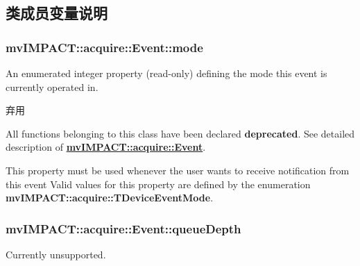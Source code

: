 \subsection{类成员变量说明}
\hypertarget{classmv_i_m_p_a_c_t_1_1acquire_1_1_event_af129965537dfc66b9661538619872fd0}{
\subsubsection[{mode}]{ mv\+I\+M\+P\+A\+C\+T\+::acquire\+::\+Event\+::mode}}\label{classmv_i_m_p_a_c_t_1_1acquire_1_1_event_af129965537dfc66b9661538619872fd0}


An enumerated integer property {\bfseries }(read-\/only) defining the mode this event is currently operated in. 

\begin{DoxyRefDesc}{弃用}
\item[\hyperlink{deprecated__deprecated000021}{弃用}]All functions belonging to this class have been declared {\bfseries deprecated}. See detailed description of {\bfseries \hyperlink{classmv_i_m_p_a_c_t_1_1acquire_1_1_event}{mv\+I\+M\+P\+A\+C\+T\+::acquire\+::\+Event}}.\end{DoxyRefDesc}


This property must be used whenever the user wants to receive notification from this event Valid values for this property are defined by the enumeration {\bfseries mv\+I\+M\+P\+A\+C\+T\+::acquire\+::\+T\+Device\+Event\+Mode}. \hypertarget{classmv_i_m_p_a_c_t_1_1acquire_1_1_event_a1317c421236a92fc1aab555c53a40906}{
\subsubsection[{queue\+Depth}]{ mv\+I\+M\+P\+A\+C\+T\+::acquire\+::\+Event\+::queue\+Depth}}\label{classmv_i_m_p_a_c_t_1_1acquire_1_1_event_a1317c421236a92fc1aab555c53a40906}


Currently unsupported. 


